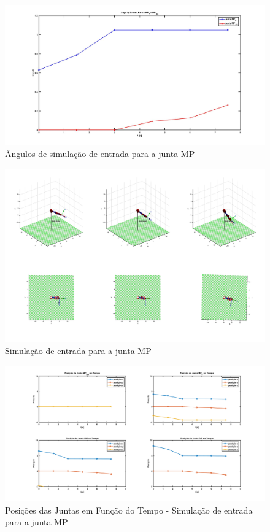 \begin{figure}[H]
\centering
\includegraphics[width = 1\textwidth]{img/angulacao_mp.jpg}
\caption[Ângulos de simulação de entrada para a junta MP]{Ângulos de simulação de entrada para a junta MP}
\label{ang_sim_mp}
\end{figure}

\begin{figure}[H]
\centering
\includegraphics[width = 1\textwidth]{img/simmp.png}
\caption[Simulação de entrada para a junta MP]{Simulação de entrada para a junta MP}
\label{sim_mp}
\end{figure}

\begin{figure}[H]
\centering
\includegraphics[width = 1\textwidth]{img/posicoes_mp.png}
\caption[Posições das Juntas em Função do Tempo - Simulação de entrada para a junta MP]{Posições das Juntas em Função do Tempo - Simulação de entrada para a junta MP}
\end{figure}

